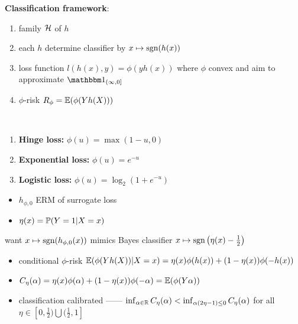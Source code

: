 \begin{setting}
    \textbf{Classification framework}:
    \begin{enumerate}
        \item family $\mathcal{H}$ of $h$
        \item each $h$ determine classifier by $x \mapsto \textnormal{sgn}(h(x))$
        \item loss function $l(h(x), y) = \phi(y h(x))$ where $\phi$ convex and aim to approximate $\In_{(\infty, 0]}$
        \item $\phi$-risk $R_\phi = \mathbb{E}(\phi(Y h(X)))$
    \end{enumerate}
\end{setting}

\begin{example}\,
    \begin{enumerate}
        \item \textbf{Hinge loss:} $\phi(u) = \max(1 - u, 0)$
        \item \textbf{Exponential loss:} $\phi(u) = e^{-u}$
        \item \textbf{Logistic loss:} $\phi(u) = \log_2 (1 + e^{-u})$
    \end{enumerate}
\end{example}

\begin{itemize}
    \item $h_{\phi, 0}$ ERM of surrogate loss
    \item $\eta(x) = \mathbb{P}(Y = 1 | X = x)$
\end{itemize}

\begin{idea}
    want $x \mapsto \textnormal{sgn}({h_{\phi, 0}(x)})$ mimics Bayes classifier $x \mapsto \textnormal{sgn}\left(\eta(x) - \frac{1}{2}\right)$
\end{idea}

\begin{itemize}
    \item conditional $\phi$-risk $\mathbb{E}(\phi(Yh(X)) | X = x) = \eta(x) \phi(h(x)) + (1 - \eta(x))\phi(-h(x))$
    \item $C_\eta(\alpha) = \eta(x) \phi(\alpha) + (1 - \eta(x))\phi(-\alpha) = \mathbb{E}(\phi(Y\alpha))$
    \item classification calibrated ------ $\inf_{\alpha \in \mathbb{R}} C_\eta(\alpha) < \inf_{\alpha(2 \eta - 1) \leq 0} C_\eta (\alpha)$ for all $\eta \in [0, \frac{1}{2}) \bigcup (\frac{1}{2}, 1]$
\end{itemize}

